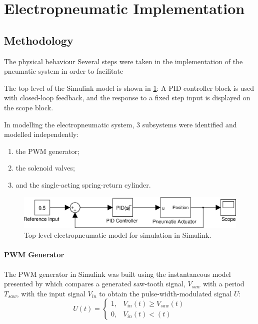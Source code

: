 \section{Electropneumatic Implementation}


\subsection{Methodology}

The physical behaviour 
Several steps were taken in the implementation of the pneumatic system in order to facilitate

The top level of the Simulink model is shown in \ref{fig:pneumatics_top_level}: A PID controller block is used with closed-loop feedback, and the response to a fixed step input is displayed on the scope block.

In modelling the electropneumatic system, 3 subsystems were identified and modelled independently:

\begin{enumerate}
  \item the PWM generator;
  \item the solenoid valves;
  \item and the single-acting spring-return cylinder.
\end{enumerate}

\begin{figure}[h]
\centering
\includegraphics[scale=1]{implementation/figures/pneumatic_modelling1}
\caption{Top-level electropneumatic model for simulation in Simulink.}
\label{fig:pneumatics_top_level}
\end{figure}

\paragraph{PWM Generator}

The PWM generator in Simulink was built using the instantaneous model presented by \citet{valve_models} which compares a generated saw-tooth signal, $V_{saw}$ with a period $T_{saw}$, with the input signal $V_{in}$ to obtain the pulse-width-modulated signal $U$:
\begin{equation}
U\left(t\right)=
\begin{cases}
1, & V_{in}\left(t\right) \geq V_{saw}\left(t\right) \\
0, & V_{in}\left(t\right) < \left(t\right)
\end{cases}
\end{equation}

